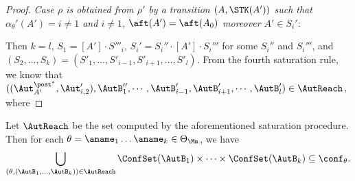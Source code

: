 \begin{proof}
\noindent \emph{Case $\rho$ is obtained from $\rho'$ by a transition $(A,\STK(A'))$ such that $\alpha_\theta'(A')=i\neq1$ and $i\neq 1$, $\aft(A')=\aft(A_0)$ moreover $A'\in S_i'$}:

Then $k = l$, $S_1 = [A']\cdot S'''_i$, $S_i'=S_i''\cdot[A']\cdot S_i'''$ for some $S_i''$ and $S_i'''$, and $(S_2, \dots, S_k) = (S'_1, \dots, S'_{i-1}, S'_{i+1}, \dots, S'_l)$. From the fourth saturation rule, we know that $((\Aut_{A'}^{\post^*},\Aut_{i,2}'),\AutB_{1}'',\cdots,\AutB_{i-1}',\AutB_{i+1}',\cdots,\AutB_{l}')\in\AutReach$, where
\end{proof}

\begin{lemma}
    Let $\AutReach$ be the set computed by the aforementioned saturation procedure. Then for each $\theta = \aname_1 \dots \aname_k \in \Theta_\Mm$, we have 
    $$\bigcup \limits_{(\theta, (\AutB_1, \dots, \AutB_k)) \in \AutReach} \ConfSet(\AutB_1) \times \dots \times \ConfSet(\AutB_k) \subseteq \conf_\theta.$$

\end{lemma}

